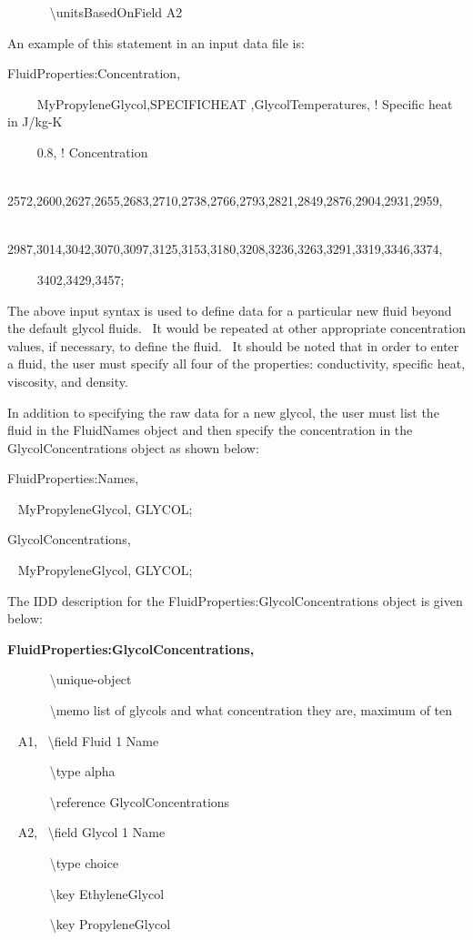 ~~~~~~ \textbackslash{}unitsBasedOnField A2

An example of this statement in an input data file is:

FluidProperties:Concentration,

~~~~ MyPropyleneGlycol,SPECIFICHEAT ,GlycolTemperatures, ! Specific heat in J/kg-K

~~~~ 0.8, ! Concentration

~~~~ 2572,2600,2627,2655,2683,2710,2738,2766,2793,2821,2849,2876,2904,2931,2959,

~~~~ 2987,3014,3042,3070,3097,3125,3153,3180,3208,3236,3263,3291,3319,3346,3374,

~~~~ 3402,3429,3457;

The above input syntax is used to define data for a particular new fluid beyond the default glycol fluids.~ It would be repeated at other appropriate concentration values, if necessary, to define the fluid.~ It should be noted that in order to enter a fluid, the user must specify all four of the properties: conductivity, specific heat, viscosity, and density.

In addition to specifying the raw data for a new glycol, the user must list the fluid in the FluidNames object and then specify the concentration in the GlycolConcentrations object as shown below:

FluidProperties:Names,

~ MyPropyleneGlycol, GLYCOL;

GlycolConcentrations,

~ MyPropyleneGlycol, GLYCOL;

The IDD description for the FluidProperties:GlycolConcentrations object is given below:

\textbf{FluidProperties:GlycolConcentrations,}

~~~~~~ \textbackslash{}unique-object

~~~~~~ \textbackslash{}memo list of glycols and what concentration they are, maximum of ten

~ A1,~ \textbackslash{}field Fluid 1 Name

~~~ ~~~\textbackslash{}type alpha

~~~~~~ \textbackslash{}reference GlycolConcentrations

~ A2,~ \textbackslash{}field Glycol 1 Name

~~~~~~ \textbackslash{}type choice

~~~~~~ \textbackslash{}key EthyleneGlycol

~~~~~~ \textbackslash{}key PropyleneGlycol

